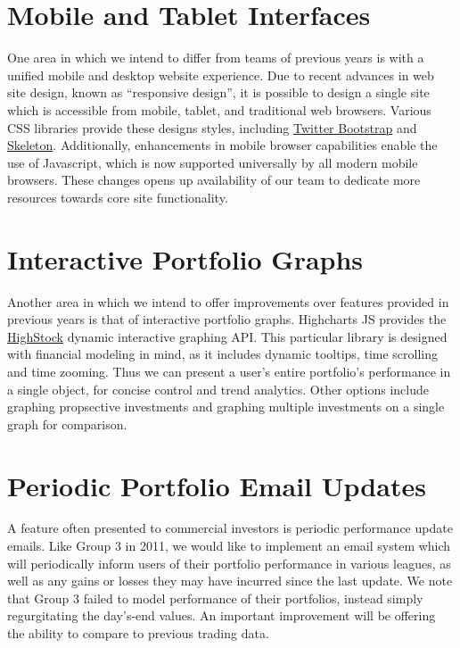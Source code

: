 \documentclass[11pt,letterpaper,oneside]{memoir}
\begin{document}
\section{Mobile and Tablet Interfaces}

One area in which we intend to differ from teams of previous years is with a unified
mobile and desktop website experience. Due to recent advances in web site design, 
known as ``responsive design'', it is possible to design a single site which is accessible 
from mobile, tablet, and traditional web browsers. Various CSS libraries provide
these designs styles, including
\href{http://twitter.github.com/bootstrap/}{Twitter Bootstrap}
and
\href{http://getskeleton.com}{Skeleton}.
Additionally, enhancements in mobile 
browser capabilities enable the use of Javascript, which is now supported universally
by all modern mobile browsers. These changes opens up availability of our team to dedicate 
more resources towards core site functionality.

\section{Interactive Portfolio Graphs}

Another area in which we intend to offer improvements over features provided in previous years
is that of interactive portfolio graphs. Highcharts JS provides the 
\href{http://www.highcharts.com/products/highstock}{HighStock} dynamic interactive graphing API.
This particular library is designed with financial modeling in mind, as it includes 
dynamic tooltips, time scrolling and time zooming. Thus we can present a user's entire 
portfolio's performance in a single object, for concise control and trend analytics. Other 
options include graphing propsective investments and graphing multiple investments on a 
single graph for comparison.

\section{Periodic Portfolio Email Updates}

A feature often presented to commercial investors is periodic performance update emails.
Like Group 3 in 2011, we would like to implement an email system which
will periodically inform users of their portfolio performance in various leagues, as well
as any gains or losses they may have incurred since the last update. We note that Group 3
failed to model performance of their portfolios, instead simply regurgitating the day's-end
values. An important improvement will be offering the ability to compare to previous trading
data.
\end{document}

